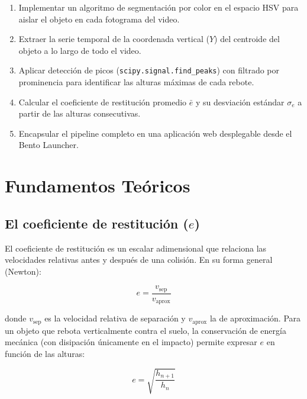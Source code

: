 \documentclass[12pt,a4paper]{article}
\begin{document}
\begin{enumerate}[label=\textbf{\arabic*.}]
    \item Implementar un algoritmo de segmentación por color en el espacio HSV para aislar el objeto en cada fotograma del video.
    \item Extraer la serie temporal de la coordenada vertical ($Y$) del centroide del objeto a lo largo de todo el video.
    \item Aplicar detección de picos (\texttt{scipy.signal.find\_peaks}) con filtrado por prominencia para identificar las alturas máximas de cada rebote.
    \item Calcular el coeficiente de restitución promedio $\bar{e}$ y su desviación estándar $\sigma_e$ a partir de las alturas consecutivas.
    \item Encapsular el pipeline completo en una aplicación web desplegable desde el Bento Launcher.
\end{enumerate}

\section{Fundamentos Teóricos}

\subsection{El coeficiente de restitución ($e$)}

El coeficiente de restitución es un escalar adimensional que relaciona las velocidades relativas antes y después de una colisión. En su forma general (Newton):

\begin{equation}
    e = \frac{v_{\text{sep}}}{v_{\text{aprox}}}
\end{equation}

donde $v_{\text{sep}}$ es la velocidad relativa de separación y $v_{\text{aprox}}$ la de aproximación. Para un objeto que rebota verticalmente contra el suelo, la conservación de energía mecánica (con disipación únicamente en el impacto) permite expresar $e$ en función de las alturas:

\begin{equation}
    \label{eq:restitution}
    e = \sqrt{\frac{h_{n+1}}{h_n}}
\end{equation}
\end{document}

